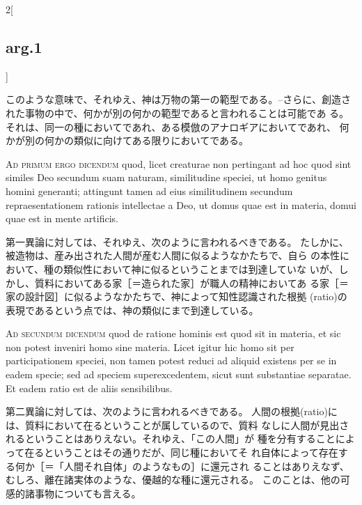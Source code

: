 \documentclass[paper=a4paper,fontsize=10pt,jafontsize=9pt,titlepage]{jlreq}
\begin{document}
\begin{paracol}{2}[\subsection{arg.1}]
\switchcolumn

このような意味で、それゆえ、神は万物の第一の範型である。--さらに、創造さ
 れた事物の中で、何かが別の何かの範型であると言われることは可能であ
 る。それは、同一の種においてであれ、ある模倣のアナロギアにおいてであれ、
 何かが別の何かの類似に向けてある限りにおいてである。

\switchcolumn*[\subsection{ad.1}]

{\scshape Ad primum ergo dicendum} quod, licet creaturae
non pertingant ad hoc quod sint similes Deo secundum suam naturam,
similitudine speciei, ut homo genitus homini generanti; attingunt tamen
ad eius similitudinem secundum repraesentationem rationis intellectae a
Deo, ut domus quae est in materia, domui quae est in mente artificis.

\switchcolumn

第一異論に対しては、それゆえ、次のように言われるべきである。
たしかに、被造物は、産み出された人間が産む人間に似るようなかたちで、自ら
 の本性において、種の類似性において神に似るということまでは到達していな
 いが、しかし、質料においてある家［＝造られた家］が職人の精神においてあ
 る家［＝家の設計図］に似るようなかたちで、神によって知性認識された根拠
 (ratio)の表現であるという点では、神の類似にまで到達している。

\switchcolumn*[\subsection{ad.2}]

{\scshape Ad secundum dicendum} quod de ratione hominis
est quod sit in materia, et sic non potest inveniri homo sine
materia. Licet igitur hic homo sit per participationem speciei, non
tamen potest reduci ad aliquid existens per se in eadem specie; sed ad
speciem superexcedentem, sicut sunt substantiae separatae. Et eadem
ratio est de aliis sensibilibus.

\switchcolumn

第二異論に対しては、次のように言われるべきである。
人間の根拠(ratio)には、質料において在るということが属しているので、質料
 なしに人間が見出されるということはありえない。それゆえ、「この人間」が
 種を分有することによって在るということはその通りだが、同じ種においてそ
 れ自体によって存在する何か［＝「人間それ自体」のようなもの］に還元され
 ることはありえなず、むしろ、離在諸実体のような、優越的な種に還元される。
 このことは、他の可感的諸事物についても言える。


\end{paracol}
\end{document}
